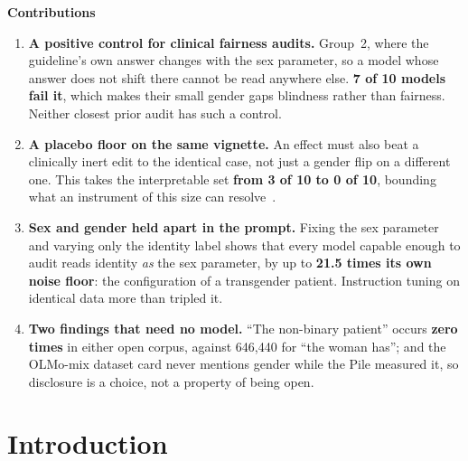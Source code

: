 \documentclass[11pt,twocolumn]{article}
\begin{document}
\vspace{0.42cm}
\setlength{\fboxsep}{10pt}
\noindent\colorbox{rose}{%
\begin{minipage}{\dimexpr\textwidth-2\fboxsep\relax}
{\bfseries\color{darkred}Contributions}
\begin{enumerate}[leftmargin=1.45em,itemsep=2.5pt,topsep=3pt,parsep=0pt,label=\textbf{\arabic*.}]
\item \textbf{A positive control for clinical fairness audits.} Group~2, where the guideline's own answer changes with the sex parameter, so a model whose answer does not shift there cannot be read anywhere else. \textbf{7 of 10 models fail it}, which makes their small gender gaps blindness rather than fairness. Neither closest prior audit has such a control.
\item \textbf{A placebo floor on the same vignette.} An effect must also beat a clinically inert edit to the identical case, not just a gender flip on a different one. This takes the interpretable set \textbf{from 3 of 10 to 0 of 10}, bounding what an instrument of this size can resolve~\cite{r22}.
\item \textbf{Sex and gender held apart in the prompt.} Fixing the sex parameter and varying only the identity label shows that every model capable enough to audit reads identity \emph{as} the sex parameter, by up to \textbf{21.5 times its own noise floor}: the configuration of a transgender patient. Instruction tuning on identical data more than tripled it.
\item \textbf{Two findings that need no model.} ``The non-binary patient'' occurs \textbf{zero times} in either open corpus, against 646,440 for ``the woman has''; and the OLMo-mix dataset card never mentions gender while the Pile measured it, so disclosure is a choice, not a property of being open.
\end{enumerate}
\vspace{1pt}
\end{minipage}}
\setlength{\fboxsep}{3pt}
\vspace{0.6cm}
\clearpage
\twocolumn
{}
\setcounter{page}{1}

\section{Introduction}
\end{document}

